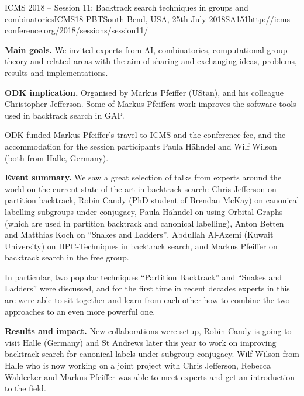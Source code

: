 \begin{event}{ICMS 2018 -- Session 11: Backtrack search techniques in groups and combinatorics}{ICMS18-PBT}{South Bend, USA, 25th July 2018}{SA}{15}{1}{http://icms-conference.org/2018/sessions/session11/}

\textbf{Main goals.}
We invited experts from AI, combinatorics, computational group theory and
related areas with the aim of sharing and exchanging ideas, problems,
results and implementations.

\textbf{ODK implication.} Organised by Markus Pfeiffer (UStan), and his
colleague Christopher Jefferson. Some of Markus Pfeiffers work improves the
software tools used in backtrack search in GAP.

ODK funded Markus Pfeiffer's travel to ICMS and the conference fee, and the
accommodation for the session participants Paula Hähndel and Wilf Wilson (both
from Halle, Germany).

\textbf{Event summary.} We saw a great selection of talks from experts around
the world on the current state of the art in backtrack search: Chris Jefferson
on partition backtrack, Robin Candy (PhD student of Brendan McKay) on canonical
labelling subgroups under conjugacy, Paula Hähndel on using Orbital Graphs
(which are used in partition backtrack and canonical labelling), Anton Betten
and Matthias Koch on ``Snakes and Ladders'', Abdullah Al-Azemi (Kuwait
University) on HPC-Techniques in backtrack search, and Markus Pfeiffer on
backtrack search in the free group.

In particular, two popular techniques ``Partition Backtrack'' and ``Snakes and
Ladders'' were discussed, and for the first time in recent decades experts in
this are were able to sit together and learn from each other how to combine the
two approaches to an even more powerful one.

\textbf{Results and impact.} New collaborations were setup, Robin Candy is going
to visit Halle (Germany) and St Andrews later this year to work on improving
backtrack search for canonical labels under subgroup conjugacy. Wilf Wilson from
Halle who is now working on a joint project with Chris Jefferson, Rebecca
Waldecker and Markus Pfeiffer was able to meet experts and get an introduction
to the field.

\end{event}
